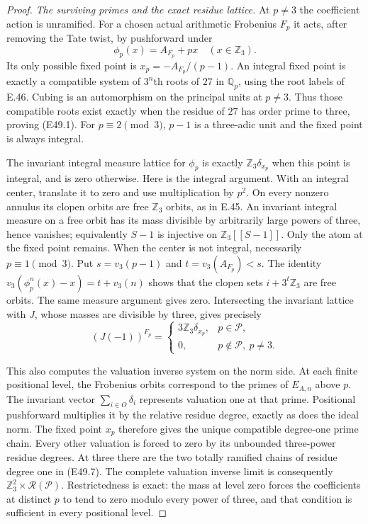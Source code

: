 \begin{proof}
\emph{The surviving primes and the exact residue lattice.}
At $p\ne3$ the coefficient
action is unramified.
For a chosen actual
arithmetic Frobenius $F_p$
it acts, after removing the
Tate twist, by pushforward
under
\[
             \phi_p(x)=A_{F_p}+px
                         \quad(x\in\mathbb Z_3).
 \tag{E49.22}
\]
Its only possible fixed
point is
$x_p=-A_{F_p}/(p-1)$.
An integral fixed point
is exactly a compatible
system of $3^n$th roots
of $27$ in $\mathbb Q_p$,
using the root labels
of E.46. Cubing is an
automorphism on the
principal units at
$p\ne3$. Thus those
compatible roots exist
exactly when the residue
of $27$ has order prime
to three, proving (E49.1).
For $p\equiv2\pmod3$,
$p-1$ is a three-adic
unit and the fixed point
is always integral.

The invariant integral
measure lattice for
$\phi_p$ is exactly
$\mathbb Z_3\delta_{x_p}$
when this point is integral,
and is zero otherwise.
Here is the integral
argument. With an integral
center, translate it to
zero and use multiplication
by $p^2$. On every nonzero
annulus its clopen orbits
are free $\mathbb Z_3$
orbits, as in E.45.
An invariant integral
measure on a free orbit
has its mass divisible
by arbitrarily large
powers of three, hence
vanishes; equivalently
$S-1$ is injective on
$\mathbb Z_3[[S-1]]$.
Only the atom at the
fixed point remains.
When the center is not
integral, necessarily
$p\equiv1\pmod3$.
Put $s=v_3(p-1)$ and
$t=v_3(A_{F_p})<s$.
The identity
$v_3(\phi_p^n(x)-x)=t+v_3(n)$
shows that the clopen
sets $i+3^t\mathbb Z_3$
are free orbits. The
same measure argument
gives zero. Intersecting
the invariant lattice
with $J$, whose masses
are divisible by three,
gives precisely
\[
 (J(-1))^{F_p}=
 \begin{cases}
      3\mathbb Z_3\delta_{x_p},&p\in\mathscr P,\\
      0,&p\notin\mathscr P,\ p\ne3.
 \end{cases}
 \tag{E49.23}
\]

This also computes the
valuation inverse system
on the norm side. At
each finite positional
level, the Frobenius
orbits correspond to
the primes of $E_{A,n}$
above $p$. The invariant
vector $\sum_{i\in O}\delta_i$
represents valuation one
at that prime. Positional
pushforward multiplies it
by the relative residue
degree, exactly as does
the ideal norm.
The fixed point $x_p$
therefore gives the unique
compatible degree-one
prime chain. Every other
valuation is forced to
zero by its unbounded
three-power residue degrees.
At three there are the
two totally ramified
chains of residue degree
one in (E49.7).
The complete valuation
inverse limit is consequently
$\mathbb Z_3^2\times\mathcal R(\mathscr P)$.
Restrictedness is exact:
the mass at level zero
forces the coefficients
at distinct $p$ to tend
to zero modulo every
power of three, and that
condition is sufficient
in every positional level.


\end{proof}
